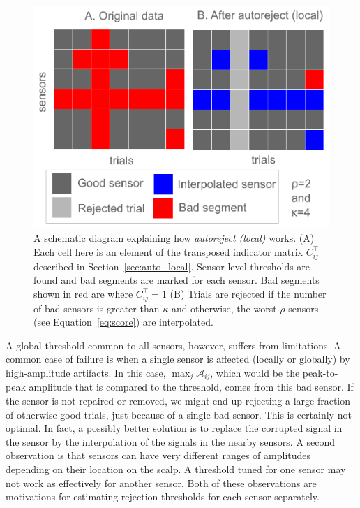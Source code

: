 \begin{figure}[t]
	\centering
	\includegraphics[width=0.65\linewidth]{figures/figure3.pdf}
    \caption[A schematic diagram explaining how \emph{autoreject (local)} works.]{A schematic diagram explaining how \emph{autoreject (local)} works. (A) Each cell here is an element of the transposed indicator matrix $C_{ij}^\top$ described in Section~\ref{sec:auto_local}. Sensor-level thresholds are found and bad segments are marked for each sensor. Bad segments shown in red are where $C_{ij}^\top=1$ (B) Trials are rejected if the number of bad sensors is greater than $\kappa$ and otherwise, the worst $\rho$ sensors (see Equation~\ref{eq:score}) are interpolated.}
    \label{fig:schematic}
\end{figure}

A global threshold common to all sensors, however, suffers from limitations. A common case of failure is when a single sensor is affected (locally or globally) by high-amplitude artifacts. In this case, $\max_{j} \mathcal{A}_{ij}$, which would be the peak-to-peak amplitude that is compared to the threshold, comes from this bad sensor. If the sensor is not repaired or removed, we might end up rejecting a large fraction of otherwise good trials, just because of a single bad sensor. This is certainly not optimal. In fact, a possibly better solution is to replace the corrupted signal in the sensor by the interpolation of the signals in the nearby sensors. A second observation is that sensors can have very different ranges of amplitudes depending on their location on the scalp. A threshold tuned for one sensor may not work as effectively for another sensor. Both of these observations are motivations for estimating rejection thresholds for each sensor separately.

